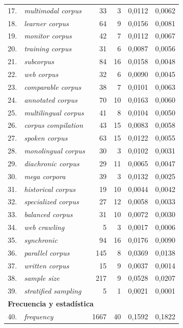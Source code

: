 \begin{longtable}{@{} r p{5cm} r r r r @{}}
17. & \textit{multimodal corpus} & 33 & 3 & 0{,}0112 & 0{,}0062 \\
18. & \textit{learner corpus} & 64 & 9 & 0{,}0156 & 0{,}0081 \\
19. & \textit{monitor corpus} & 42 & 7 & 0{,}0112 & 0{,}0067 \\
20. & \textit{training corpus} & 31 & 6 & 0{,}0087 & 0{,}0056 \\
21. & \textit{subcorpus} & 84 & 16 & 0{,}0158 & 0{,}0048 \\
22. & \textit{web corpus} & 32 & 6 & 0{,}0090 & 0{,}0045 \\
23. & \textit{comparable corpus} & 38 & 7 & 0{,}0101 & 0{,}0063 \\
24. & \textit{annotated corpus} & 70 & 10 & 0{,}0163 & 0{,}0060 \\
25. & \textit{multilingual corpus} & 41 & 8 & 0{,}0104 & 0{,}0050 \\
26. & \textit{corpus compilation} & 43 & 15 & 0{,}0083 & 0{,}0058 \\
27. & \textit{spoken corpus} & 63 & 15 & 0{,}0122 & 0{,}0055 \\
28. & \textit{monolingual corpus} & 30 & 3 & 0{,}0102 & 0{,}0031 \\
29. & \textit{diachronic corpus} & 29 & 11 & 0{,}0065 & 0{,}0047 \\
30. & \textit{mega corpora} & 39 & 3 & 0{,}0132 & 0{,}0025 \\
31. & \textit{historical corpus} & 19 & 10 & 0{,}0044 & 0{,}0042 \\
32. & \textit{specialized corpus} & 27 & 12 & 0{,}0058 & 0{,}0033 \\
33. & \textit{balanced corpus} & 31 & 10 & 0{,}0072 & 0{,}0030 \\
34. & \textit{web crawling} & 5 & 3 & 0{,}0017 & 0{,}0006 \\
35. & \textit{synchronic} & 94 & 16 & 0{,}0176 & 0{,}0090 \\
36. & \textit{parallel corpus} & 145 & 8 & 0{,}0369 & 0{,}0138 \\
37. & \textit{written corpus} & 15 & 9 & 0{,}0037 & 0{,}0014 \\
38. & \textit{sample size} & 217 & 9 & 0{,}0528 & 0{,}0207 \\
39. & \textit{stratified sampling} & 5 & 1 & 0{,}0021 & 0{,}0001 \\
\midrule
\multicolumn{6}{l}{\textbf{Frecuencia y estadística}} \\
\midrule
40. & \textit{frequency} & 1667 & 40 & 0{,}1592 & 0{,}1822 \\

\end{longtable}
